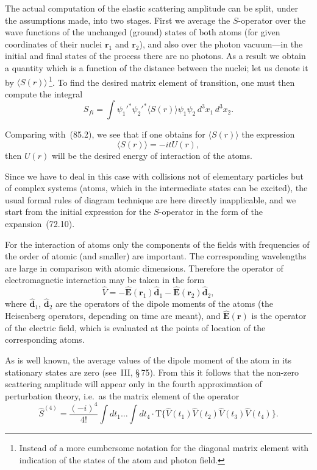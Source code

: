The actual computation of the elastic scattering amplitude can be split, under the assumptions made, into two stages. First we average the $S$-operator over the wave functions of the unchanged (ground) states of both atoms (for given coordinates of their nuclei $\mathbf{r}_1$ and $\mathbf{r}_2$), and also over the photon vacuum---in the initial and final states of the process there are no photons. As a result we obtain a quantity which is a function of the distance between the nuclei; let us denote it by $\langle S(r)\rangle$\,\footnote{Instead of a more cumbersome notation for the diagonal matrix element with indication of the states of the atom and photon field.}. To find the desired matrix element of transition, one must then compute the integral
\begin{equation}
S_{fi} = \int\psi_1'^*\psi_2'^*\langle S(r)\rangle\psi_1\psi_2\,d^3x_1\,d^3x_2.
\tag{85.3}
\end{equation}

Comparing with~(85.2), we see that if one obtains for $\langle S(r)\rangle$ the expression
\[
\langle S(r)\rangle = -itU(r),
\]
then $U(r)$ will be the desired energy of interaction of the atoms.

Since we have to deal in this case with collisions not of elementary particles but of complex systems (atoms, which in the intermediate states can be excited), the usual formal rules of diagram technique are here directly inapplicable, and we start from the initial expression for the $S$-operator in the form of the expansion~(72.10).

For the interaction of atoms only the components of the fields with frequencies of the order of atomic (and smaller) are important. The corresponding wavelengths are large in comparison with atomic dimensions. Therefore the operator of electromagnetic interaction may be taken in the form
\begin{equation}
\hat{V} = -\hat{\mathbf{E}}(\mathbf{r}_1)\hat{\mathbf{d}}_1 - \hat{\mathbf{E}}(\mathbf{r}_2)\hat{\mathbf{d}}_2,
\tag{85.4}
\end{equation}
where $\hat{\mathbf{d}}_1$, $\hat{\mathbf{d}}_2$ are the operators of the dipole moments of the atoms (the Heisenberg operators, depending on time are meant), and $\hat{\mathbf{E}}(\mathbf{r})$ is the operator of the electric field, which is evaluated at the points of location of the corresponding atoms.

As is well known, the average values of the dipole moment of the atom in its stationary states are zero (see~III, \S\,75). From this it follows that the non-zero scattering amplitude will appear only in the fourth approximation of perturbation theory, i.e.\ as the matrix element of the operator
\begin{equation}
\hat{S}^{(4)} = \frac{(-i)^4}{4!}\int dt_1\ldots\int dt_4\cdot\mathrm{T}\{\hat{V}(t_1)\hat{V}(t_2)\hat{V}(t_3)\hat{V}(t_4)\}.
\tag{85.5}
\end{equation}

